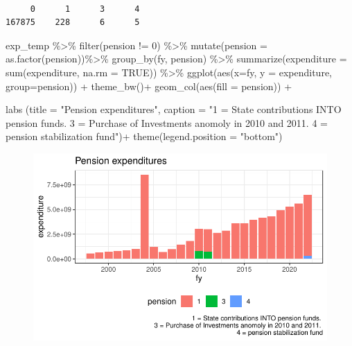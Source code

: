 \documentclass[
  letterpaper,
  DIV=11,
  numbers=noendperiod]{scrreport}
\newenvironment{Shaded}{\begin{snugshade}}{\end{snugshade}}
\newcommand{\AttributeTok}[1]{\textcolor[rgb]{0.40,0.45,0.13}{#1}}
\newcommand{\ConstantTok}[1]{\textcolor[rgb]{0.56,0.35,0.01}{#1}}
\newcommand{\DecValTok}[1]{\textcolor[rgb]{0.68,0.00,0.00}{#1}}
\newcommand{\FunctionTok}[1]{\textcolor[rgb]{0.28,0.35,0.67}{#1}}
\newcommand{\NormalTok}[1]{\textcolor[rgb]{0.00,0.23,0.31}{#1}}
\newcommand{\SpecialCharTok}[1]{\textcolor[rgb]{0.37,0.37,0.37}{#1}}
\newcommand{\StringTok}[1]{\textcolor[rgb]{0.13,0.47,0.30}{#1}}
\begin{document}
\begin{verbatim}

     0      1      3      4 
167875    228      6      5 
\end{verbatim}

\begin{Shaded}
\begin{Highlighting}[]
\NormalTok{exp\_temp }\SpecialCharTok{\%\textgreater{}\%} 
  \FunctionTok{filter}\NormalTok{(pension }\SpecialCharTok{!=} \DecValTok{0}\NormalTok{) }\SpecialCharTok{\%\textgreater{}\%}
  \FunctionTok{mutate}\NormalTok{(}\AttributeTok{pension =} \FunctionTok{as.factor}\NormalTok{(pension))}\SpecialCharTok{\%\textgreater{}\%}
  \FunctionTok{group\_by}\NormalTok{(fy, pension) }\SpecialCharTok{\%\textgreater{}\%} 
  \FunctionTok{summarize}\NormalTok{(}\AttributeTok{expenditure =} \FunctionTok{sum}\NormalTok{(expenditure, }\AttributeTok{na.rm =} \ConstantTok{TRUE}\NormalTok{)) }\SpecialCharTok{\%\textgreater{}\%}
  \FunctionTok{ggplot}\NormalTok{(}\FunctionTok{aes}\NormalTok{(}\AttributeTok{x=}\NormalTok{fy, }\AttributeTok{y =}\NormalTok{ expenditure, }\AttributeTok{group=}\NormalTok{pension)) }\SpecialCharTok{+} 
  \FunctionTok{theme\_bw}\NormalTok{()}\SpecialCharTok{+}
  \FunctionTok{geom\_col}\NormalTok{(}\FunctionTok{aes}\NormalTok{(}\AttributeTok{fill =}\NormalTok{ pension)) }\SpecialCharTok{+} 

  \FunctionTok{labs}\NormalTok{ (}\AttributeTok{title =} \StringTok{"Pension expenditures"}\NormalTok{, }
  \AttributeTok{caption =} \StringTok{"1 = State contributions INTO pension funds. }
\StringTok{  3 = Purchase of Investments anomoly in 2010 and 2011. }
\StringTok{  4 = pension stabilization fund"}\NormalTok{)}\SpecialCharTok{+}
    \FunctionTok{theme}\NormalTok{(}\AttributeTok{legend.position =} \StringTok{"bottom"}\NormalTok{)}
\end{Highlighting}
\end{Shaded}

\begin{figure}[H]

{\centering \includegraphics{./Everything_files/figure-pdf/pensions-1.pdf}

}

\end{figure}
\end{document}
